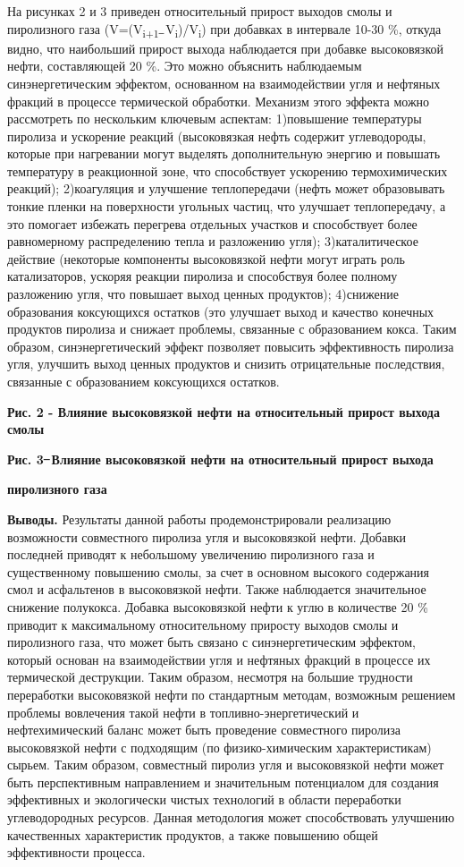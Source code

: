 На рисунках 2 и 3 приведен относительный прирост выходов смолы и
пиролизного газа (V=(V\textsubscript{i+1 ̶}
V\textsubscript{i})/V\textsubscript{i}) при добавках в интервале 10-30
\%, откуда видно, что наибольший прирост выхода наблюдается при добавке
высоковязкой нефти, составляющей 20 \%. Это можно объяснить наблюдаемым
синэнергетическим эффектом, основанном на взаимодействии угля и нефтяных
фракций в процессе термической обработки. Механизм этого эффекта можно
рассмотреть по нескольким ключевым аспектам: 1)повышение температуры
пиролиза и ускорение реакций (высоковязкая нефть содержит углеводороды,
которые при нагревании могут выделять дополнительную энергию и повышать
температуру в реакционной зоне, что способствует ускорению
термохимических реакций); 2)коагуляция и улучшение теплопередачи (нефть
может образовывать тонкие пленки на поверхности угольных частиц, что
улучшает теплопередачу, а это помогает избежать перегрева отдельных
участков и способствует более равномерному распределению тепла и
разложению угля); 3)каталитическое действие (некоторые компоненты
высоковязкой нефти могут играть роль катализаторов, ускоряя реакции
пиролиза и способствуя более полному разложению угля, что повышает выход
ценных продуктов); 4)снижение образования коксующихся остатков (это
улучшает выход и качество конечных продуктов пиролиза и снижает
проблемы, связанные с образованием кокса. Таким образом,
синэнергетический эффект позволяет повысить эффективность пиролиза угля,
улучшить выход ценных продуктов и снизить отрицательные последствия,
связанные с образованием коксующихся остатков.

{\bfseries Рис. 2 - Влияние высоковязкой нефти на относительный прирост
выхода смолы}

{\bfseries Рис. 3 ̶ Влияние высоковязкой нефти на относительный прирост
выхода}

{\bfseries пиролизного газа}

{\bfseries Выводы.} Результаты данной работы продемонстрировали реализацию
возможности совместного пиролиза угля и высоковязкой нефти. Добавки
последней приводят к небольшому увеличению пиролизного газа и
существенному повышению смолы, за счет в основном высокого содержания
смол и асфальтенов в высоковязкой нефти. Также наблюдается значительное
снижение полукокса. Добавка высоковязкой нефти к углю в количестве 20 \%
приводит к максимальному относительному приросту выходов смолы и
пиролизного газа, что может быть связано с синэнергетическим эффектом,
который основан на взаимодействии угля и нефтяных фракций в процессе их
термической деструкции. Таким образом, несмотря на большие трудности
переработки высоковязкой нефти по стандартным методам, возможным
решением проблемы вовлечения такой нефти в топливно-энергетический и
нефтехимический баланс может быть проведение совместного пиролиза
высоковязкой нефти с подходящим (по физико-химическим характеристикам)
сырьем. Таким образом, совместный пиролиз угля и высоковязкой нефти
может быть перспективным направлением и значительным потенциалом для
создания эффективных и экологически чистых технологий в области
переработки углеводородных ресурсов. Данная методология может
способствовать улучшению качественных характеристик продуктов, а также
повышению общей эффективности процесса.

